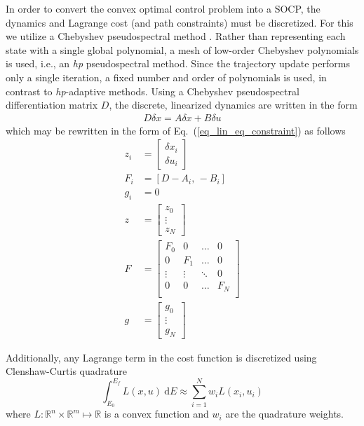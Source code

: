 \documentclass[letterpaper, preprint, paper,11pt]{AAS}	%
\begin{document}
	In order to convert the convex optimal control problem into a SOCP, the dynamics and Lagrange cost (and path constraints) must be discretized. For this we utilize a Chebyshev pseudospectral method \cite{ChebyPS}. Rather than representing each state with a single global polynomial, a mesh of low-order Chebyshev polynomials is used, i.e., an \textit{hp} pseudospectral method.\cite{HP_PS_ConvexDescent} Since the trajectory update performs only a single iteration, a fixed number and order of polynomials is used, in contrast to \textit{hp}-adaptive methods\cite{darby2011hp}.
	Using a Chebyshev pseudospectral differentiation matrix $D$, the discrete, linearized dynamics are written in the form 
	\begin{align}
	D\delta x = A\delta x + B\delta u
	\end{align}
	which may be rewritten in the form of Eq.~(\ref{eq_lin_eq_constraint}) as follows
	\begin{align}
	z_i& = \left[\begin{array}{c}
	\delta x_i \\
	\delta u_i 
	\end{array}\right] \\
	F_i &= [D-A_i,\,-B_i] \\
	g_i &= 0 \\
	z &= \left[\begin{array}{c}
		 z_0 \\
		\vdots \\
		z_N 
		\end{array}\right]\label{eq_z} \\
	F &= \left[\begin{array}{cccc}
	F_0 &0 &\dots& 0 \\
	0& F_1 &\dots& 0 \\
	\vdots & \vdots &\ddots&0 \\
	0& 0& \dots& F_N \\
	\end{array}\right]	\label{eq_F} \\
	g &= \left[\begin{array}{c}
		g_0 \\
		\vdots \\
		g_N 
		\end{array}\right] \label{eq_g}
	\end{align}

	Additionally, any Lagrange term in the cost function is discretized using Clenshaw-Curtis quadrature
	\begin{equation}
	\int_{E_0}^{E_f} L(x,u)\ \mathrm{d}E \approx \sum_{i=1}^{N}w_iL(x_i,u_i)
	\end{equation}
	where $L:\mathbb{R}^n\times\mathbb{R}^m\mapsto\mathbb{R}$ is a convex function and $w_i$ are the quadrature weights. 
	
\end{document}
